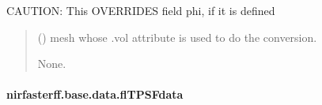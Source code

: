 \documentclass[letterpaper,10pt,english]{sphinxmanual}
\begin{document}
\begin{fulllineitems}
\begin{fulllineitems}
\sphinxAtStartPar
CAUTION: This OVERRIDES field phi, if it is defined
\begin{quote}\begin{description}
\sphinxAtStartPar
{} () \textendash{} mesh whose .vol attribute is used to do the conversion.

\sphinxAtStartPar
None.

\end{description}\end{quote}

\end{fulllineitems}


\end{fulllineitems}


\sphinxstepscope


\paragraph{nirfasterff.base.data.flTPSFdata}
\label{\detokenize{_autosummary/nirfasterff.base.data.flTPSFdata:nirfasterff-base-data-fltpsfdata}}\label{\detokenize{_autosummary/nirfasterff.base.data.flTPSFdata::doc}}
\end{document}
